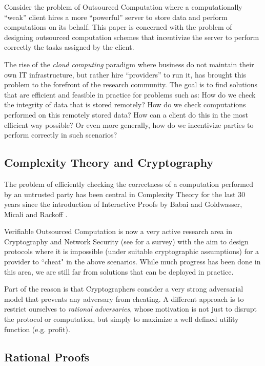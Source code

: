 Consider the problem of {\sf Outsourced Computation} where a computationally  ``weak'' client hires a more  ``powerful'' server to store data and perform computations on its behalf. This paper is concerned with the problem of designing outsourced computation schemes that incentivize the server to perform correctly the tasks assigned by the client. 

The rise of the {\em cloud computing} paradigm where business do not maintain their own IT infrastructure, but rather hire  ``providers'' to run it, has brought this problem to the forefront of the research community. The goal is to find solutions that are efficient and feasible in practice for problems such as: How do we check the integrity of data that is stored remotely? How do we check computations performed on this remotely stored data? How can a client do this in the most efficient way possible? Or even more generally, how do we incentivize parties to perform correctly in such scenarios?


\subsection{Complexity Theory and Cryptography}

The problem of efficiently checking the correctness of a computation performed by an untrusted party has been central in Complexity Theory for the last 30 years since the introduction of Interactive Proofs by Babai and Goldwasser, Micali and Rackoff \cite{babai,gmr}. 

{\sf Verifiable Outsourced Computation} is now a very active research area in Cryptography and Network Security (see \cite{wb15} for a survey) with the aim to design protocols where it is impossible (under suitable cryptographic assumptions) for a provider to ``cheat" in the above scenarios. While much progress has been done in this area, we are still far from solutions that can be deployed in practice. 

Part of the reason is that Cryptographers consider a very strong adversarial model that prevents {\sf any} adversary from cheating. A different approach is to restrict ourselves to {\em rational adversaries}, whose motivation is not just to disrupt the protocol or computation, but simply to maximize a well defined utility function (e.g. profit).

\subsection{Rational Proofs}

